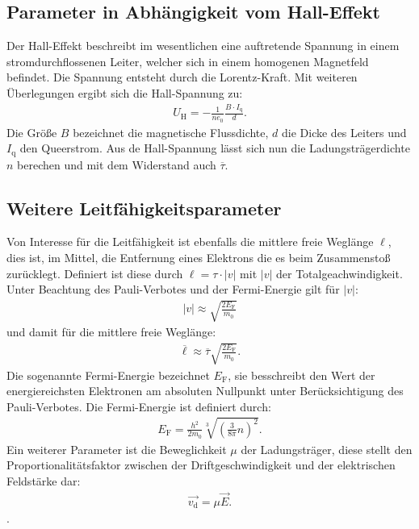 \subsection{Parameter in Abhängigkeit vom Hall-Effekt}
Der Hall-Effekt beschreibt im wesentlichen eine auftretende Spannung in einem stromdurchflossenen Leiter, welcher sich in
einem homogenen Magnetfeld befindet. Die Spannung entsteht durch die Lorentz-Kraft.
Mit weiteren Überlegungen ergibt sich die Hall-Spannung zu:
\begin{align}
 U_\mathrm{H}=-\frac{1}{ne_0}\frac{B\cdot I_\mathrm{q}}{d} \label{eqn:u_h}.
\end{align}
Die Größe $B$ bezeichnet die magnetische Flussdichte, $d$ die Dicke des Leiters und $I_\mathrm{q}$ den Queerstrom.
Aus de Hall-Spannung lässt sich nun die Ladungsträgerdichte $n$ berechen und mit dem Widerstand auch $\overline{\tau}$.

\subsection{Weitere Leitfähigkeitsparameter}
Von Interesse für die Leitfähigkeit ist ebenfalls die mittlere freie Weglänge $\ell$, dies ist, im Mittel, die Entfernung eines Elektrons die
es beim Zusammenstoß zurücklegt. Definiert ist diese durch $\ell=\tau\cdot|v|$ mit $|v|$ der Totalgeachwindigkeit.
Unter Beachtung des Pauli-Verbotes und der Fermi-Energie gilt für $|v|$:
\begin{align}
 |v|\approx \sqrt{\frac{2E_\mathrm{F}}{m_0}}\label{eqn:v}
\end{align}
und damit für die mittlere freie Weglänge:
\begin{align}
\overline{\ell} \approx \overline{\tau}\sqrt{\frac{2 E_\mathrm{F}}{m_0}}.\label{eqn:l}
\end{align}
Die sogenannte Fermi-Energie bezeichnet $E_\mathrm{F}$, sie besschreibt den Wert der energiereichsten Elektronen am absoluten Nullpunkt unter
Berücksichtigung des Pauli-Verbotes. Die Fermi-Energie ist definiert durch:
\begin{align}
E_\mathrm{F}=\frac{h^2}{2m_0}\sqrt[3]{\left(\frac{3}{8\pi}n\right)^2}.%
\end{align}
Ein weiterer Parameter ist die Beweglichkeit $\mu$ der Ladungsträger, diese stellt den Proportionalitätsfaktor
zwischen der Driftgeschwindigkeit und der elektrischen Feldstärke dar:
\begin{align}
\vec{v_\mathrm{d}}=\mu \vec{E}.
\end{align}.
